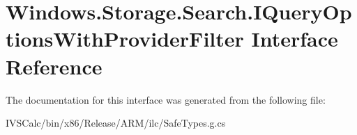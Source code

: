 \hypertarget{interface_windows_1_1_storage_1_1_search_1_1_i_query_options_with_provider_filter}{}\section{Windows.\+Storage.\+Search.\+I\+Query\+Options\+With\+Provider\+Filter Interface Reference}
\label{interface_windows_1_1_storage_1_1_search_1_1_i_query_options_with_provider_filter}


The documentation for this interface was generated from the following file\+:\begin{DoxyCompactItemize}
\item 
I\+V\+S\+Calc/bin/x86/\+Release/\+A\+R\+M/ilc/Safe\+Types.\+g.\+cs\end{DoxyCompactItemize}
